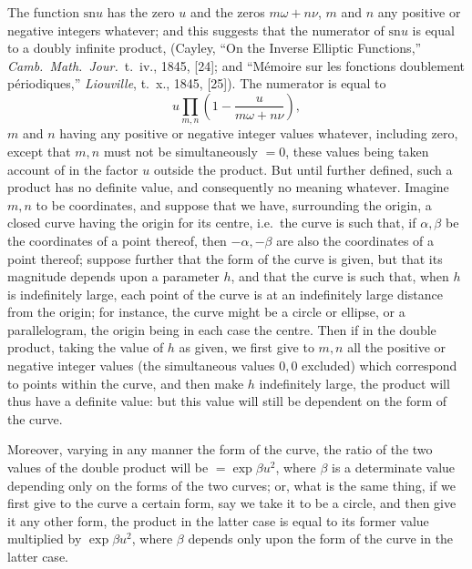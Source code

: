 \documentclass[11pt,a4paper]{book}
\providecommand{\sn}{\mathrm{sn}}
\begin{document}
The function $\sn u$ has the zero $u$ and the zeros $m\omega + n\nu$, $m$ and $n$ any positive or negative integers whatever; and this suggests that the numerator of $\sn u$ is equal to a doubly infinite product, (Cayley, ``On the Inverse Elliptic Functions,'' \textit{Camb.\ Math.\ Jour.}\ t.~iv., 1845, [24]; and ``M\'{e}moire sur les fonctions doublement p\'{e}riodiques,'' \textit{Liouville}, t.~x., 1845, [25]). The numerator is equal to
\[
u \prod_{m,n}\left(1 - \frac{u}{m\omega + n\nu}\right),
\]
$m$ and $n$ having any positive or negative integer values whatever, including zero, except that $m, n$ must not be simultaneously $= 0$, these values being taken account of in the factor $u$ outside the product. But until further defined, such a product has no definite value, and consequently no meaning whatever. Imagine $m, n$ to be coordinates, and suppose that we have, surrounding the origin, a closed curve having the origin for its centre, i.e.\ the curve is such that, if $\alpha, \beta$ be the coordinates of a point thereof, then $-\alpha, -\beta$ are also the coordinates of a point thereof; suppose further that the form of the curve is given, but that its magnitude depends upon a parameter $h$, and that the curve is such that, when $h$ is indefinitely large, each point of the curve is at an indefinitely large distance from the origin; for instance, the curve might be a circle or ellipse, or a parallelogram, the origin being in each case the centre. Then if in the double product, taking the value of $h$ as given, we first give to $m, n$ all the positive or negative integer values (the simultaneous values $0, 0$ excluded) which correspond to points within the curve, and then make $h$ indefinitely large, the product will thus have a definite value: but this value will still be dependent on the form of the curve.

Moreover, varying in any manner the form of the curve, the ratio of the two values of the double product will be $= \exp\beta u^{2}$, where $\beta$ is a determinate value depending only on the forms of the two curves; or, what is the same thing, if we first give to the curve a certain form, say we take it to be a circle, and then give it any other form, the product in the latter case is equal to its former value multiplied by $\exp\beta u^{2}$, where $\beta$ depends only upon the form of the curve in the latter case.
\end{document}

